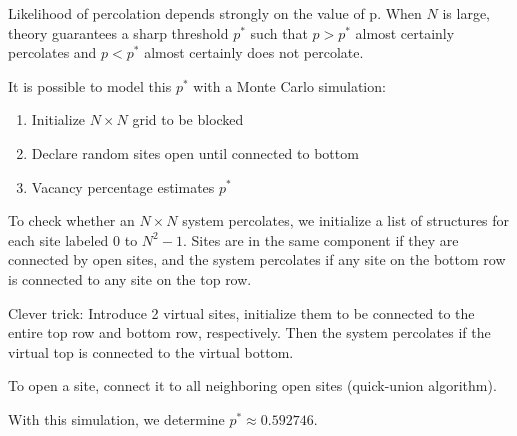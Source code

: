 \documentclass[11pt]{article}
\begin{document}
		Likelihood of percolation depends strongly on the value of p. When $N$ is large, theory guarantees a sharp threshold $p^*$ such that $p > p^*$ almost certainly percolates and $p < p^*$ almost certainly does not percolate.
		
		It is possible to model this $p^*$ with a Monte Carlo simulation:
		\begin{enumerate}
			\item Initialize $N\times N$ grid to be blocked
			\item Declare random sites open until connected to bottom
			\item Vacancy percentage estimates $p^*$
		\end{enumerate}
		
		To check whether an $N\times N$ system percolates, we initialize a list of structures for each site labeled $0$ to $N^2 - 1$. Sites are in the same component if they are connected by open sites, and the system percolates if any site on the bottom row is connected to any site on the top row.	
		
		Clever trick: Introduce 2 virtual sites, initialize them to be connected to the entire top row and bottom row, respectively. Then the system percolates if the virtual top is connected to the virtual bottom.
		
		To open a site, connect it to all neighboring open sites (quick-union algorithm).
		
		With this simulation, we determine $p^* \approx 0.592746$.
		
		
		\def\enotesize{\normalsize}
		\theendnotes
\end{document}
